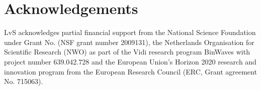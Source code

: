 \documentclass[twocolumn]{aastex63}
\begin{document}
\section*{Acknowledgements}
LvS acknowledges partial financial support from the  National Science Foundation under Grant No. (NSF grant number 2009131),
the Netherlands Organisation for Scientific Research (NWO) as part of the Vidi research program BinWaves with project number 639.042.728
and the European Union’s Horizon 2020 research and innovation program from the European Research Council (ERC, Grant agreement No. 715063).


\newpage

\end{document}
